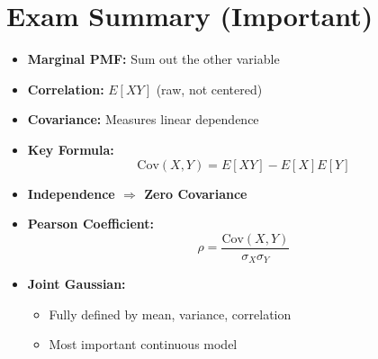 \documentclass[11pt]{article}
\begin{document}
\section{Exam Summary (Important)}

\begin{itemize}
    \item \textbf{Marginal PMF:} Sum out the other variable
    \item \textbf{Correlation:} $E[XY]$ (raw, not centered)
    \item \textbf{Covariance:} Measures linear dependence
    \item \textbf{Key Formula:}
    \[
    \text{Cov}(X,Y) = E[XY] - E[X]E[Y]
    \]
    \item \textbf{Independence $\Rightarrow$ Zero Covariance}
    \item \textbf{Pearson Coefficient:}
    \[
    \rho = \frac{\text{Cov}(X,Y)}{\sigma_X \sigma_Y}
    \]
    \item \textbf{Joint Gaussian:}
    \begin{itemize}
        \item Fully defined by mean, variance, correlation
        \item Most important continuous model
    \end{itemize}
\end{itemize}
\end{document}
